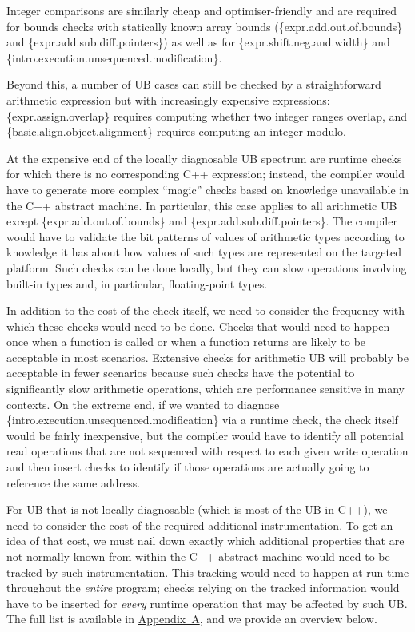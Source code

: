{Integer comparisons are similarly cheap and optimiser-friendly and are   required for bounds checks with statically known array bounds
(\{expr.add.out.of.bounds\} and
\{expr.add.sub.diff.pointers\})
as well as for \{expr.shift.neg.and.width\} 
and \{intro.execution.unsequenced.modification\}.

Beyond this, a number of UB cases can still be checked by a straightforward arithmetic expression but with increasingly expensive expressions: \{expr.assign.overlap\} requires computing whether two integer ranges overlap, and  \{basic.align.object.alignment\} requires computing an integer modulo. 

At the expensive end of the locally diagnosable UB spectrum are runtime checks for which there is no corresponding C++ expression; instead, the compiler would have to generate more complex ``magic'' checks based on knowledge unavailable in the C++ abstract machine. In particular, this case applies to all arithmetic UB except \{expr.add.out.of.bounds\} and
\{expr.add.sub.diff.pointers\}. The compiler would have to validate the bit patterns of values of arithmetic types according to knowledge it has about how values of such types are represented on the targeted platform. Such checks can be done locally, but they can slow operations involving built-in types and, in particular, floating-point types.

In addition to the cost of the check itself, we need to consider the frequency with which these checks would need to be done. Checks that would need to happen once when a function is called or when a function returns are likely to be acceptable in most scenarios. Extensive checks for arithmetic UB will probably be acceptable in fewer scenarios because such checks have the potential to significantly slow arithmetic operations, which are performance sensitive in many contexts. On the extreme end, if we wanted to diagnose \{intro.execution.unsequenced.modification\} via a runtime check, the check itself would be fairly inexpensive, but the compiler would have to identify all potential read operations that are not sequenced with respect to each given write operation and then insert checks to identify if those operations are actually going to reference the same address.

For UB that is not locally diagnosable (which is most of the UB in C++), we need to consider the cost of the required additional instrumentation. To get an idea of that cost, we must nail down exactly which additional properties that are not normally known from within the C++ abstract machine would need to be tracked by such instrumentation. This tracking would need to happen at run time throughout the \emph{entire} program; checks relying on the tracked information would have to be inserted for \emph{every} runtime operation that may be affected by such UB.
The full list is available in \hyperref[appendix]{Appendix~A}, and we provide an overview below.

}
